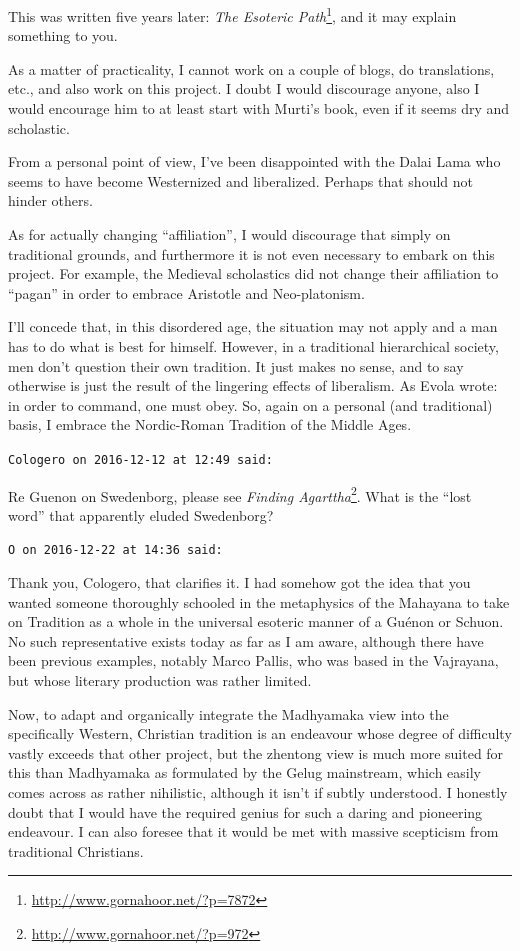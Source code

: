 \begin{footnotesize}
\begin{sffamily}
This was written five years later: \textit{The Esoteric Path}\footnote{\url{http://www.gornahoor.net/?p=7872}}, and it may explain something to you.

As a matter of practicality, I cannot work on a couple of blogs, do translations, etc., and also work on this project. I doubt I would discourage anyone, also I would encourage him to at least start with Murti's book, even if it seems dry and scholastic.

From a personal point of view, I've been disappointed with the Dalai Lama who seems to have become Westernized and liberalized. Perhaps that should not hinder others.

As for actually changing ``affiliation'', I would discourage that simply on traditional grounds, and furthermore it is not even necessary to embark on this project. For example, the Medieval scholastics did not change their affiliation to ``pagan'' in order to embrace Aristotle and Neo-platonism.

I'll concede that, in this disordered age, the situation may not apply and a man has to do what is best for himself. However, in a traditional hierarchical society, men don't question their own tradition. It just makes no sense, and to say otherwise is just the result of the lingering effects of liberalism. As Evola wrote: in order to command, one must obey. So, again on a personal (and traditional) basis, I embrace the Nordic-Roman Tradition of the Middle Ages.

\hfill

\texttt{Cologero on 2016-12-12 at 12:49 said:}

Re Guenon on Swedenborg, please see \textit{Finding Agarttha}\footnote{\url{http://www.gornahoor.net/?p=972}}. What is the ``lost word'' that apparently eluded Swedenborg?

\hfill

\texttt{O on 2016-12-22 at 14:36 said:}

Thank you, Cologero, that clarifies it. I had somehow got the idea that you wanted someone thoroughly schooled in the metaphysics of the Mahayana to take on Tradition as a whole in the universal esoteric manner of a Guénon or Schuon. No such representative exists today as far as I am aware, although there have been previous examples, notably Marco Pallis, who was based in the Vajrayana, but whose literary production was rather limited.

Now, to adapt and organically integrate the Madhyamaka view into the specifically Western, Christian tradition is an endeavour whose degree of difficulty vastly exceeds that other project, but the zhentong view is much more suited for this than Madhyamaka as formulated by the Gelug mainstream, which easily comes across as rather nihilistic, although it isn't if subtly understood. I honestly doubt that I would have the required genius for such a daring and pioneering endeavour. I can also foresee that it would be met with massive scepticism from traditional Christians.


\end{sffamily}
\end{footnotesize}
